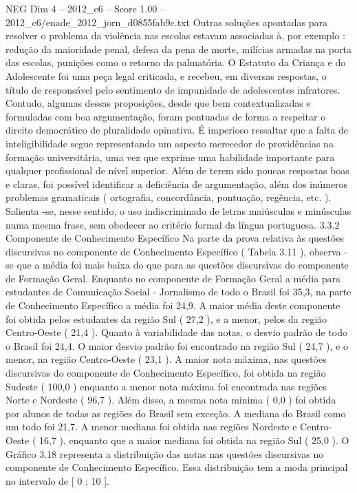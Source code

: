 \begin{textsample}{NEG Dim 4 – 2012\_c6 – Score 1.00 – 2012\_c6/enade\_2012\_jorn\_d0855fab9c.txt}
Outras soluções apontadas para resolver o problema da violência nas escolas estavam associadas à, por exemplo : redução da maioridade penal, defesa da pena de morte, milícias armadas na porta das escolas, punições como o retorno da palmatória.
O Estatuto da Criança e do Adolescente foi uma peça legal criticada, e recebeu, em diversas respostas, o título de responsável pelo sentimento de impunidade de adolescentes infratores.
Contudo, algumas dessas proposições, desde que bem contextualizadas e formuladas com boa argumentação, foram pontuadas de forma a respeitar o direito democrático de pluralidade opinativa.
É imperioso ressaltar que a falta de inteligibilidade segue representando um aspecto merecedor de providências na formação universitária, uma vez que exprime uma habilidade importante para qualquer profissional de nível superior.
Além de terem sido poucas respostas boas e claras, foi possível identificar a deficiência de argumentação, além dos inúmeros problemas gramaticais ( ortografia, concordância, pontuação, regência, etc. ).
Salienta -se, nesse sentido, o uso indiscriminado de letras maiúsculas e minúsculas numa mesma frase, sem obedecer ao critério formal da língua portuguesa. 3.3.2 Componente de Conhecimento Específico Na parte da prova relativa às questões discursivas no componente de Conhecimento Específico ( Tabela 3.11 ), observa -se que a média foi mais baixa do que para as questões discursivas do componente de Formação Geral.
Enquanto no componente de Formação Geral a média para estudantes de Comunicação Social - Jornalismo de todo o Brasil foi 35,3, na parte de Conhecimento Específico a média foi 24,9.
A maior média deste componente foi obtida pelos estudantes da região Sul ( 27,2 ), e a menor, pelos da região Centro-Oeste ( 21,4 ).
Quanto à variabilidade das notas, o desvio padrão de todo o Brasil foi 24,4.
O maior desvio padrão foi encontrado na região Sul ( 24,7 ), e o menor, na região Centro-Oeste ( 23,1 ).
A maior nota máxima, nas questões discursivas do componente de Conhecimento Específico, foi obtida na região Sudeste ( 100,0 ) enquanto a menor nota máxima foi encontrada nas regiões Norte e Nordeste ( 96,7 ).
Além disso, a mesma nota mínima ( 0,0 ) foi obtida por alunos de todas as regiões do Brasil sem exceção.
A mediana do Brasil como um todo foi 21,7.
A menor mediana foi obtida nas regiões Nordeste e Centro-Oeste ( 16,7 ), enquanto que a maior mediana foi obtida na região Sul ( 25,0 ).
O Gráfico 3.18 representa a distribuição das notas nas questões discursivas no componente de Conhecimento Específico.
Essa distribuição tem a moda principal no intervalo de [ 0 ; 10 ].

\end{textsample}
